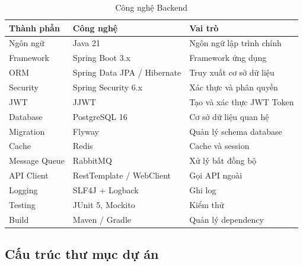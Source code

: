 \documentclass[12pt,a4paper]{report}
\begin{document}
\begin{table}[H]
\centering
\caption{Công nghệ Backend}
\begin{tabular}{|p{4cm}|p{5cm}|p{6cm}|}
\hline
\textbf{Thành phần} & \textbf{Công nghệ} & \textbf{Vai trò} \\
\hline
Ngôn ngữ & Java 21 & Ngôn ngữ lập trình chính \\
\hline
Framework & Spring Boot 3.x & Framework ứng dụng \\
\hline
ORM & Spring Data JPA / Hibernate & Truy xuất cơ sở dữ liệu \\
\hline
Security & Spring Security 6.x & Xác thực và phân quyền \\
\hline
JWT & JJWT & Tạo và xác thực JWT Token \\
\hline
Database & PostgreSQL 16 & Cơ sở dữ liệu quan hệ \\
\hline
Migration & Flyway & Quản lý schema database \\
\hline
Cache & Redis & Cache và session \\
\hline
Message Queue & RabbitMQ & Xử lý bất đồng bộ \\
\hline
API Client & RestTemplate / WebClient & Gọi API ngoài \\
\hline
Logging & SLF4J + Logback & Ghi log \\
\hline
Testing & JUnit 5, Mockito & Kiểm thử \\
\hline
Build & Maven / Gradle & Quản lý dependency \\
\hline
\end{tabular}
\label{tab:backend_technologies}
\end{table}

\subsection{Cấu trúc thư mục dự án}
\end{document}
